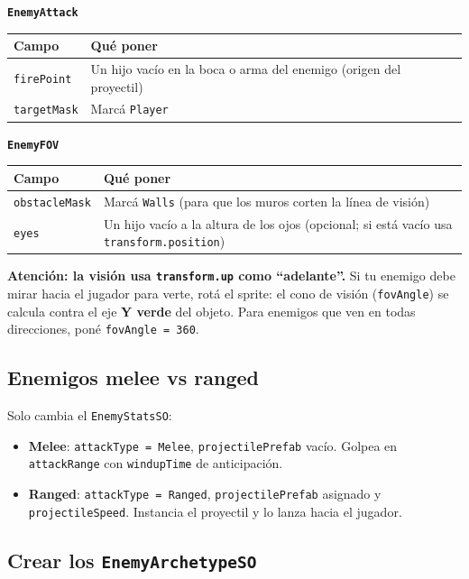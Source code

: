 \documentclass[a4paper,12pt]{article}
\newcommand{\code}[1]{\texttt{#1}}
\begin{document}
\textbf{\code{EnemyAttack}}

\begin{center}
\begin{tabular}{|l|p{8.4cm}|}
\hline
\textbf{Campo} & \textbf{Qué poner} \\
\hline
\code{firePoint} & Un hijo vacío en la boca o arma del enemigo (origen del proyectil) \\
\hline
\code{targetMask} & Marcá \code{Player} \\
\hline
\end{tabular}
\end{center}

\textbf{\code{EnemyFOV}}

\begin{center}
\begin{tabular}{|l|p{8.4cm}|}
\hline
\textbf{Campo} & \textbf{Qué poner} \\
\hline
\code{obstacleMask} & Marcá \code{Walls} (para que los muros corten la línea de visión) \\
\hline
\code{eyes} & Un hijo vacío a la altura de los ojos (opcional; si está vacío usa \code{transform.position}) \\
\hline
\end{tabular}
\end{center}

\textbf{Atención: la visión usa \code{transform.up} como ``adelante''.} Si tu enemigo debe mirar
hacia el jugador para verte, rotá el sprite: el cono de visión (\code{fovAngle}) se calcula contra
el eje \textbf{Y verde} del objeto. Para enemigos que ven en todas direcciones, poné
\code{fovAngle = 360}.

\subsection{Enemigos melee vs ranged}

Solo cambia el \code{EnemyStatsSO}:

\begin{itemize}
    \item \textbf{Melee}: \code{attackType = Melee}, \code{projectilePrefab} vacío. Golpea en \code{attackRange} con \code{windupTime} de anticipación.
    \item \textbf{Ranged}: \code{attackType = Ranged}, \code{projectilePrefab} asignado y \code{projectileSpeed}. Instancia el proyectil y lo lanza hacia el jugador.
\end{itemize}

\subsection{Crear los \code{EnemyArchetypeSO}}
\end{document}
